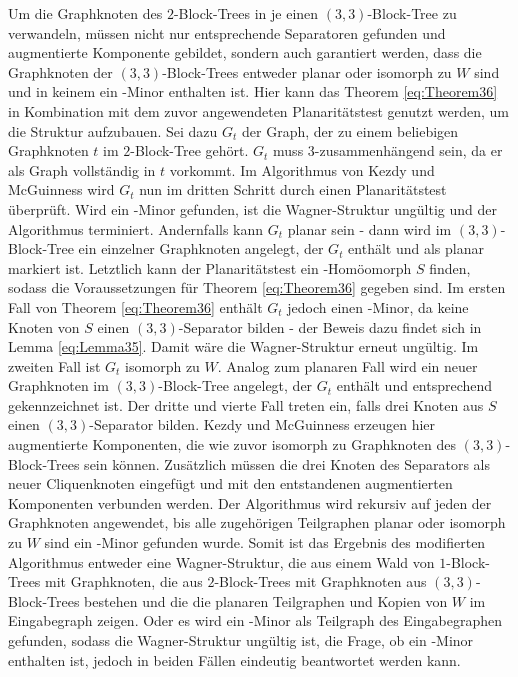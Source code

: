 Um die Graphknoten des $2$-Block-Trees in je einen $(3, 3)$-Block-Tree zu verwandeln, müssen nicht nur entsprechende Separatoren gefunden und augmentierte Komponente gebildet, sondern auch garantiert werden, dass die Graphknoten der $(3, 3)$-Block-Trees entweder planar oder isomorph zu $W$ sind und in keinem ein \kf-Minor enthalten ist.
Hier kann das Theorem \ref{eq:Theorem36} in Kombination mit dem zuvor angewendeten Planaritätstest genutzt werden, um die Struktur aufzubauen.
Sei dazu $G_t$ der Graph, der zu einem beliebigen Graphknoten $t$ im $2$-Block-Tree gehört.
$G_t$ muss $3$-zusammenhängend sein, da er als Graph vollständig in $t$ vorkommt.
Im Algorithmus von Kezdy und McGuinness wird $G_t$ nun im dritten Schritt durch einen Planaritätstest überprüft.
Wird ein \kf-Minor gefunden, ist die Wagner-Struktur ungültig und der Algorithmus terminiert.
Andernfalls kann $G_t$ planar sein - dann wird im $(3, 3)$-Block-Tree ein einzelner Graphknoten angelegt, der $G_t$ enthält und als planar markiert ist.
Letztlich kann der Planaritätstest ein \kdd-Homöomorph $S$ finden, sodass die Voraussetzungen für Theorem \ref{eq:Theorem36} gegeben sind.
Im ersten Fall von Theorem \ref{eq:Theorem36} enthält $G_t$ jedoch einen \kf-Minor, da keine Knoten von $S$ einen $(3, 3)$-Separator bilden - der Beweis dazu findet sich in Lemma \ref{eq:Lemma35}.
Damit wäre die Wagner-Struktur erneut ungültig.
Im zweiten Fall ist $G_t$ isomorph zu $W$.
Analog zum planaren Fall wird ein neuer Graphknoten im $(3, 3)$-Block-Tree angelegt, der $G_t$ enthält und entsprechend gekennzeichnet ist.
Der dritte und vierte Fall treten ein, falls drei Knoten aus $S$ einen $(3, 3)$-Separator bilden.
Kezdy und McGuinness erzeugen hier augmentierte Komponenten, die wie zuvor isomorph zu Graphknoten des $(3, 3)$-Block-Trees sein können.
Zusätzlich müssen die drei Knoten des Separators als neuer Cliquenknoten eingefügt und mit den entstandenen augmentierten Komponenten verbunden werden.
Der Algorithmus wird rekursiv auf jeden der Graphknoten angewendet, bis alle zugehörigen Teilgraphen planar oder isomorph zu $W$ sind \bzw ein \kf-Minor gefunden wurde.
Somit ist das Ergebnis des modifierten Algorithmus entweder eine Wagner-Struktur, die aus einem Wald von $1$-Block-Trees mit Graphknoten, die aus $2$-Block-Trees mit Graphknoten aus $(3, 3)$-Block-Trees bestehen und die die planaren Teilgraphen und Kopien von $W$ im Eingabegraph zeigen.
Oder es wird ein \kf-Minor als Teilgraph des Eingabegraphen gefunden, sodass die Wagner-Struktur ungültig ist, die Frage, ob ein \kf-Minor enthalten ist, jedoch in beiden Fällen eindeutig beantwortet werden kann.

